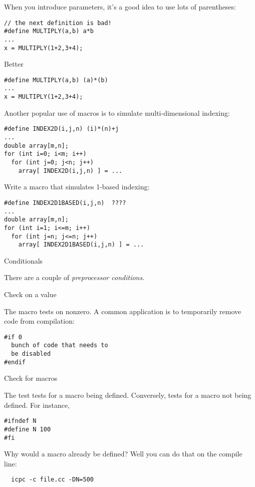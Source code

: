 When you introduce parameters, it's a good idea to use lots of parentheses:
\begin{verbatim}
// the next definition is bad!
#define MULTIPLY(a,b) a*b
...
x = MULTIPLY(1+2,3+4);
\end{verbatim}
Better
\begin{verbatim}
#define MULTIPLY(a,b) (a)*(b)
...
x = MULTIPLY(1+2,3+4);
\end{verbatim}

Another popular use of macros is to simulate multi-dimensional indexing:
\begin{verbatim}
#define INDEX2D(i,j,n) (i)*(n)+j
...
double array[m,n];
for (int i=0; i<m; i++)
  for (int j=0; j<n; j++)
    array[ INDEX2D(i,j,n) ] = ...
\end{verbatim}

\begin{exercise}
  Write a macro that simulates 1-based indexing:
\begin{verbatim}
#define INDEX2D1BASED(i,j,n)  ????
...
double array[m,n];
for (int i=1; i<=m; i++)
  for (int j=n; j<=n; j++)
    array[ INDEX2D1BASED(i,j,n) ] = ...
\end{verbatim}
\end{exercise}


 {Conditionals}


There are a couple of \emph{preprocessor conditions}.

 {Check on a value}

The  macro tests on nonzero. A common application is to
temporarily remove code from compilation:
\begin{verbatim}
#if 0
  bunch of code that needs to
  be disabled
#endif
\end{verbatim}

 {Check for macros}

The 
test tests for a macro being defined. Conversely,
tests for a macro not being defined. For instance,
\begin{verbatim}
#ifndef N
#define N 100
#fi
\end{verbatim}
Why would a macro already be defined? Well you can do that on the
compile line:
\begin{verbatim}
  icpc -c file.cc -DN=500
\end{verbatim}

